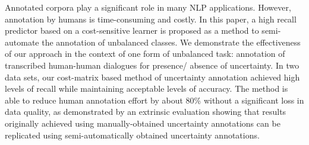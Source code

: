 Annotated corpora play a significant role in many NLP applications. However, annotation
 by humans is time-consuming and costly.
 In this paper, a high recall predictor based
 on a cost-sensitive learner is proposed as a
 method to semi-automate the annotation of
 unbalanced classes. We demonstrate the effectiveness
 of our approach in the context of
 one form of unbalanced task: annotation of
 transcribed human-human dialogues for presence/
 absence of uncertainty. In two data
 sets, our cost-matrix based method of uncertainty
 annotation achieved high levels of recall
 while maintaining acceptable levels of accuracy.
 The method is able to reduce human
 annotation effort by about 80\% without a significant
 loss in data quality, as demonstrated
 by an extrinsic evaluation showing that results
 originally achieved using manually-obtained
 uncertainty annotations can be replicated using
 semi-automatically obtained uncertainty
 annotations.

